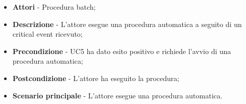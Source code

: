                 \begin{itemize}

                    \item \textbf{Attori} - Procedura batch;
                    \item \textbf{Descrizione} - L'attore esegue una procedura automatica a seguito di un critical event ricevuto;
                    \item \textbf{Precondizione} - UC5 ha dato esito positivo e richiede l'avvio di una procedura automatica;
                    \item \textbf{Postcondizione} - L'attore ha eseguito la procedura;
                    \item \textbf{Scenario principale} - L'attore esegue una procedura automatica.

                \end{itemize}

	    
                
            
		